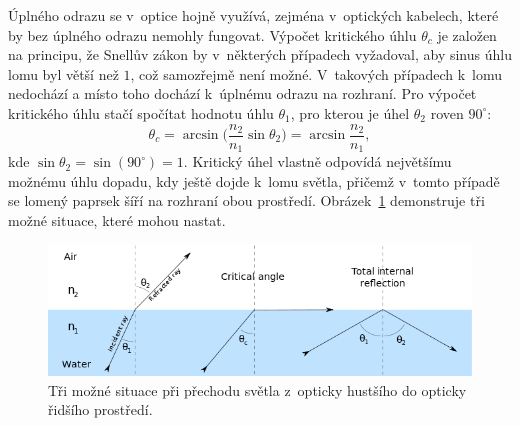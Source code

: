 Úplného odrazu se v~optice hojně využívá, zejména
v~optických kabelech, které by bez úplného odrazu
nemohly fungovat. Výpočet kritického úhlu $\theta_c$
je založen na principu, že Snellův zákon by v~některých
případech vyžadoval, aby sinus úhlu lomu byl 
větší než $1$, což samozřejmě není možné. V~takových
případech k~lomu nedochází a místo toho dochází
k~úplnému odrazu na rozhraní. Pro výpočet kritického
úhlu stačí spočítat hodnotu úhlu $\theta_1$,
pro kterou je úhel $\theta_2$ roven $90^\circ$:
$$
\theta_c = \arcsin\Big(\frac{n_2}{n_1}
\sin\theta_2\Big) = \arcsin\frac{n_2}{n_1},
$$
kde $\sin\theta_2 = \sin(90^\circ) = 1$.
Kritický úhel vlastně odpovídá největšímu možnému
úhlu dopadu, kdy ještě dojde k~lomu světla, přičemž
v~tomto případě se lomený paprsek šíří na rozhraní
obou prostředí. Obrázek~\ref{fig:critical_angle}
demonstruje tři možné situace, které mohou nastat.
\begin{figure}[htbp]
    \centering
    \includegraphics[scale=0.58]{img/critical_angle.png}
    \caption{Tři možné situace při přechodu světla
    z~opticky hustšího do opticky řidšího prostředí.}
    \label{fig:critical_angle}
\end{figure}

